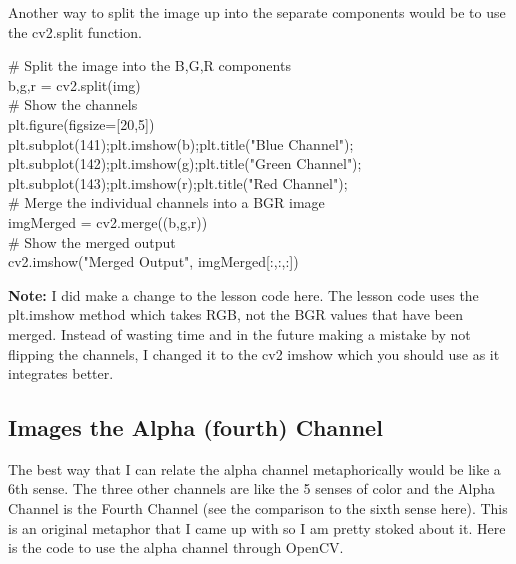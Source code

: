 \documentclass[fleqn]{article}
\begin{document}
    Another way to split the image up into the separate components would be to use the cv2.split function.

    \begin{center}
      $\#$ Split the image into the B,G,R components\\
      b,g,r = cv2.split(img)\\[0.25in]

      $\#$ Show the channels\\
      plt.figure(figsize=[20,5])\\
      plt.subplot(141);plt.imshow(b);plt.title("Blue Channel");\\
      plt.subplot(142);plt.imshow(g);plt.title("Green Channel");\\
      plt.subplot(143);plt.imshow(r);plt.title("Red Channel");\\[0.25in]

      $\#$ Merge the individual channels into a BGR image\\
      imgMerged = cv2.merge((b,g,r))\\
      $\#$ Show the merged output\\
      cv2.imshow("Merged Output", imgMerged[:,:,:])\\[0.25in]
    \end{center}
    \textbf{Note:} I did make a change to the lesson code here. The lesson code uses the plt.imshow method which takes RGB, not the BGR values that have been merged. Instead of wasting time and in the future making a mistake by not flipping the channels, I changed it to the cv2 imshow which you should use as it integrates better.

    \newpage

    \subsection{Images the Alpha (fourth) Channel}
    The best way that I can relate the alpha channel metaphorically would be like a 6th sense.  The three other channels are like the 5 senses of color and the Alpha Channel is the Fourth Channel (see the comparison to the sixth sense here). This is an original metaphor that I came up with so I am pretty stoked about it. Here is the code to use the alpha channel through OpenCV.
\end{document}
